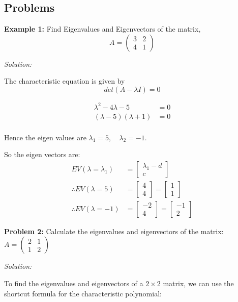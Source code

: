 \documentclass[
  letterpaper,
  DIV=11,
  numbers=noendperiod]{scrreprt}
\theoremstyle{plain}
\theoremstyle{definition}
\theoremstyle{remark}
\begin{document}
\subsection{Problems}\label{problems}

\textbf{Example 1:} Find Eigenvalues and Eigenvectors of the matrix,
\[A = \begin{pmatrix} 3 & 2 \\ 4 & 1 \end{pmatrix}\]

\emph{Solution:}

The characteristic equation is given by \[det(A-\lambda I)=0\]

\begin{align*}
\lambda^2 - 4\lambda - 5 &= 0\\
(\lambda-5)(\lambda+1)&=0\\
\end{align*}

Hence the eigen values are \(\lambda_1=5,\quad \lambda_2=-1\).

So the eigen vectors are: \begin{align*}
EV(\lambda=\lambda_1)&=\begin{bmatrix}\lambda_1-d\\ c\end{bmatrix}\\
\therefore EV(\lambda=5)&=\begin{bmatrix}4\\ 4\end{bmatrix}=\begin{bmatrix}1\\ 1\end{bmatrix}\\
\therefore EV(\lambda=-1)&=\begin{bmatrix}-2\\ 4\end{bmatrix}=\begin{bmatrix}-1\\ 2\end{bmatrix}
\end{align*}

\textbf{Problem 2:} Calculate the eigenvalues and eigenvectors of the
matrix: \(A = \begin{pmatrix} 2 & 1 \\ 1 & 2 \end{pmatrix}\)

\emph{Solution:}

To find the eigenvalues and eigenvectors of a \(2 \times 2\) matrix, we
can use the shortcut formula for the characteristic polynomial:
\end{document}
